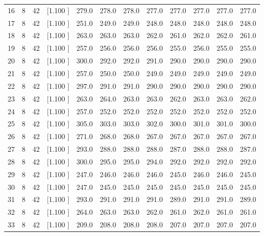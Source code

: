 \documentclass[12pt,a4paper]{article}
\begin{document}
\begin{center}
{\begin{tabular}{r r r r r r r r r r r r}
  16&  8& 42&[1.100     ]&   279.0&   278.0&   278.0&   277.0&   277.0&   277.0&   277.0&   277.0\\[-0.02in]
  17&  8& 42&[1.100     ]&   251.0&   249.0&   249.0&   248.0&   248.0&   248.0&   248.0&   248.0\\[-0.02in]
  18&  8& 42&[1.100     ]&   263.0&   263.0&   263.0&   262.0&   261.0&   262.0&   262.0&   261.0\\[-0.02in]
  19&  8& 42&[1.100     ]&   257.0&   256.0&   256.0&   256.0&   255.0&   256.0&   255.0&   255.0\\[-0.02in]
  20&  8& 42&[1.100     ]&   300.0&   292.0&   292.0&   291.0&   290.0&   290.0&   290.0&   290.0\\[-0.02in]
  21&  8& 42&[1.100     ]&   257.0&   250.0&   250.0&   249.0&   249.0&   249.0&   249.0&   249.0\\[-0.02in]
  22&  8& 42&[1.100     ]&   297.0&   291.0&   291.0&   290.0&   290.0&   290.0&   290.0&   290.0\\[-0.02in]
  23&  8& 42&[1.100     ]&   263.0&   264.0&   263.0&   263.0&   262.0&   263.0&   263.0&   262.0\\[-0.02in]
  24&  8& 42&[1.100     ]&   257.0&   252.0&   252.0&   252.0&   252.0&   252.0&   252.0&   252.0\\[-0.02in]
  25&  8& 42&[1.100     ]&   305.0&   303.0&   303.0&   302.0&   300.0&   301.0&   301.0&   300.0\\[-0.02in]
  26&  8& 42&[1.100     ]&   271.0&   268.0&   268.0&   267.0&   267.0&   267.0&   267.0&   267.0\\[-0.02in]
  27&  8& 42&[1.100     ]&   293.0&   288.0&   288.0&   288.0&   287.0&   288.0&   288.0&   287.0\\[-0.02in]
  28&  8& 42&[1.100     ]&   300.0&   295.0&   295.0&   294.0&   292.0&   292.0&   292.0&   292.0\\[-0.02in]
  29&  8& 42&[1.100     ]&   247.0&   246.0&   246.0&   246.0&   245.0&   246.0&   246.0&   245.0\\[-0.02in]
  30&  8& 42&[1.100     ]&   247.0&   245.0&   245.0&   245.0&   245.0&   245.0&   245.0&   245.0\\[-0.02in]
  31&  8& 42&[1.100     ]&   293.0&   291.0&   291.0&   291.0&   289.0&   291.0&   291.0&   289.0\\[-0.02in]
  32&  8& 42&[1.100     ]&   264.0&   263.0&   263.0&   262.0&   261.0&   262.0&   261.0&   261.0\\[-0.02in]
  33&  8& 42&[1.100     ]&   209.0&   208.0&   208.0&   208.0&   207.0&   207.0&   207.0&   207.0\\[-0.02in]

\end{tabular}}
\end{center}
\end{document}
